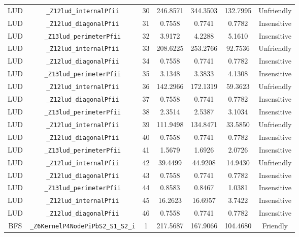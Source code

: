 \documentclass{article}
\begin{document}
\begin{table}[H]
\begin{tabular}{c c c c c c c}
LUD & \verb|_Z12lud_internalPfii|                    & 30 & 246.8571  & 344.3503 &  132.7995 & Unfriendly\\
LUD & \verb|_Z12lud_diagonalPfii|                    & 31 & 0.7558    & 0.7741   &    0.7782 & Insensitive\\
LUD & \verb|_Z13lud_perimeterPfii|                   & 32 & 3.9172    & 4.2288   &    5.1610 & Insensitive\\
LUD & \verb|_Z12lud_internalPfii|                    & 33 & 208.6225  & 253.2766 &   92.7536 & Unfriendly\\
LUD & \verb|_Z12lud_diagonalPfii|                    & 34 & 0.7558    & 0.7741   &    0.7782 & Insensitive\\
LUD & \verb|_Z13lud_perimeterPfii|                   & 35 & 3.1348    & 3.3833   &    4.1308 & Insensitive\\
LUD & \verb|_Z12lud_internalPfii|                    & 36 & 142.2966  & 172.1319 &   59.3623 & Unfriendly\\
LUD & \verb|_Z12lud_diagonalPfii|                    & 37 & 0.7558    & 0.7741   &    0.7782 & Insensitive\\
LUD & \verb|_Z13lud_perimeterPfii|                   & 38 & 2.3514    & 2.5387   &    3.1034 & Insensitive\\
LUD & \verb|_Z12lud_internalPfii|                    & 39 & 111.9498  & 134.8471 &   33.5850 & Unfriendly\\
LUD & \verb|_Z12lud_diagonalPfii|                    & 40 & 0.7558    & 0.7741   &    0.7782 & Insensitive\\
LUD & \verb|_Z13lud_perimeterPfii|                   & 41 & 1.5679    & 1.6926   &    2.0726 & Insensitive\\
LUD & \verb|_Z12lud_internalPfii|                    & 42 & 39.4499   & 44.9208  &   14.9430 & Unfriendly\\
LUD & \verb|_Z12lud_diagonalPfii|                    & 43 & 0.7558    & 0.7741   &    0.7782 & Insensitive\\
LUD & \verb|_Z13lud_perimeterPfii|                   & 44 & 0.8583    & 0.8467   &    1.0381 & Insensitive\\
LUD & \verb|_Z12lud_internalPfii|                    & 45 & 16.2623   & 16.6957  &    3.7422 & Insensitive\\
LUD & \verb|_Z12lud_diagonalPfii|                    & 46 & 0.7558    & 0.7741   &    0.7782 & Insensitive\\
BFS & \verb|_Z6KernelP4NodePiPbS2_S1_S2_i|           & 1  & 217.5687  & 167.9066 & 104.4680  & Friendly\\

\end{tabular}
\end{table}
\end{document}
